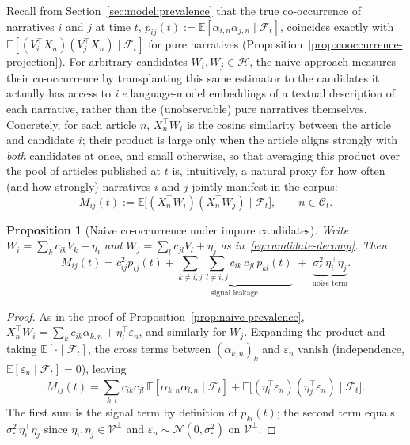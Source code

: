 \documentclass[
  journal=medium,
  manuscript=article-type,
  year=2025,
  volume=1,
]{cup-journal}
\newtheorem{proposition}{Proposition}
\begin{document}
Recall from Section~\ref{sec:model:prevalence} that the true co-occurrence of
narratives $i$ and $j$ at time $t$, $p_{ij}(t) := \mathbb
E[\alpha_{i,n}\alpha_{j,n}\mid\mathcal F_t]$, coincides exactly with $\mathbb
E[(V_i^\top X_n)(V_j^\top X_n)\mid\mathcal F_t]$ for pure narratives
(Proposition~\ref{prop:cooccurrence-projection}). For arbitrary candidates
$W_i,W_j\in\mathcal H$, the naive approach measures their co-occurrence by
transplanting this same estimator to the candidates it actually has access
to \textit{i.e} language-model embeddings of a textual description of each narrative,
rather than the (unobservable) pure narratives themselves. Concretely, for
each article $n$, $X_n^\top W_i$ is the cosine similarity between the article
and candidate $i$; their product is large only when the article aligns
strongly with \emph{both} candidates at once, and small otherwise, so that
averaging this product over the pool of articles published at $t$ is,
intuitively, a natural proxy for how often (and how strongly) narratives $i$
and $j$ jointly manifest in the corpus:
\begin{equation}
    \label{eq:naive-cooccurrence}
    M_{ij}(t) := \mathbb E\bigl[(X_n^\top W_i)(X_n^\top W_j)\mid\mathcal F_t\bigr], \qquad n\in\mathcal C_t.
\end{equation}

\begin{proposition}[Naive co-occurrence under impure candidates]
\label{prop:naive-cooccurrence}
Write $W_i = \sum_k c_{ik}V_k + \eta_i$ and $W_j = \sum_l c_{jl}V_l+\eta_j$ as
in~\eqref{eq:candidate-decomp}. Then
\begin{equation}
    \label{eq:naive-cooccurrence-decomp}
    M_{ij}(t) = c_{ij}^2p_{ij}(t) +  \underbrace{\sum_{k\ne i,j}\sum_{l \ne i,j} c_{ik}\,c_{jl}\,p_{kl}(t)}_{\text{signal leakage}} \;+\; \underbrace{\sigma_\varepsilon^2\,\eta_i^\top\eta_j}_{\text{noise term}}.
\end{equation}
\end{proposition}

\begin{proof}
As in the proof of Proposition~\ref{prop:naive-prevalence}, $X_n^\top W_i =
\sum_k c_{ik}\alpha_{k,n} + \eta_i^\top\varepsilon_n$, and similarly for
$W_j$. Expanding the product and taking $\mathbb E[\cdot\mid\mathcal F_t]$,
the cross terms between $(\alpha_{k,n})_k$ and $\varepsilon_n$ vanish
(independence, $\mathbb E[\varepsilon_n\mid\mathcal F_t]=0$), leaving
\[
M_{ij}(t) = \sum_{k,l} c_{ik}c_{jl}\,\mathbb E[\alpha_{k,n}\alpha_{l,n}\mid\mathcal F_t] + \mathbb E\bigl[(\eta_i^\top\varepsilon_n)(\eta_j^\top\varepsilon_n)\mid\mathcal F_t\bigr].
\]
The first sum is the signal term by definition of $p_{kl}(t)$; the second
term equals $\sigma_\varepsilon^2\,\eta_i^\top\eta_j$ since $\eta_i,\eta_j\in\mathcal
V^\perp$ and $\varepsilon_n\sim\mathcal N(0,\sigma_\varepsilon^2)$ on
$\mathcal V^\perp$.
\end{proof}
\end{document}

